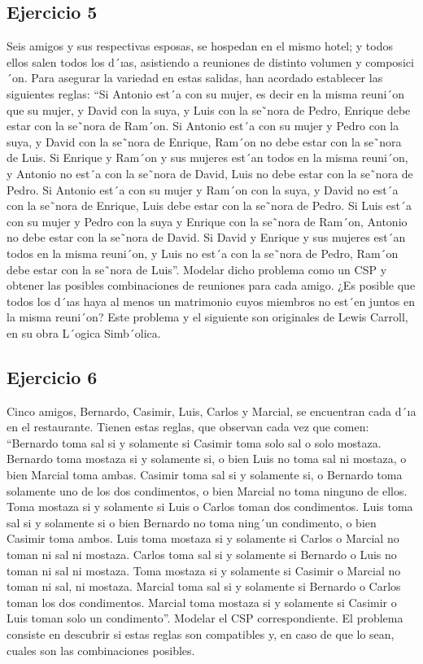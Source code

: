 \subsection{Ejercicio 5} Seis amigos y sus respectivas esposas, se hospedan en el mismo hotel; y todos ellos
salen todos los d´ıas, asistiendo a reuniones de distinto volumen y composici´on. Para
asegurar la variedad en estas salidas, han acordado establecer las siguientes reglas: “Si
Antonio est´a con su mujer, es decir en la misma reuni´on que su mujer, y David con
la suya, y Luis con la se˜nora de Pedro, Enrique debe estar con la se˜nora de Ram´on.
Si Antonio est´a con su mujer y Pedro con la suya, y David con la se˜nora de Enrique,
Ram´on no debe estar con la se˜nora de Luis. Si Enrique y Ram´on y sus mujeres est´an
todos en la misma reuni´on, y Antonio no est´a con la se˜nora de David, Luis no debe
estar con la se˜nora de Pedro. Si Antonio est´a con su mujer y Ram´on con la suya, y
David no est´a con la se˜nora de Enrique, Luis debe estar con la se˜nora de Pedro. Si Luis
est´a con su mujer y Pedro con la suya y Enrique con la se˜nora de Ram´on, Antonio no
debe estar con la se˜nora de David. Si David y Enrique y sus mujeres est´an todos en la
misma reuni´on, y Luis no est´a con la se˜nora de Pedro, Ram´on debe estar con la se˜nora
de Luis”.
\medskip
Modelar dicho problema como un CSP y obtener las posibles combinaciones de reuniones para cada amigo. ¿Es posible que todos los d´ıas haya al menos un matrimonio
cuyos miembros no est´en juntos en la misma reuni´on? Este problema y el siguiente son
originales de Lewis Carroll, en su obra L´ogica Simb´olica.


\subsection{Ejercicio 6} Cinco amigos, Bernardo, Casimir, Luis, Carlos y Marcial, se encuentran cada d´ıa en el
restaurante. Tienen estas reglas, que observan cada vez que comen: “Bernardo toma
sal si y solamente si Casimir toma solo sal o solo mostaza. Bernardo toma mostaza si y
solamente si, o bien Luis no toma sal ni mostaza, o bien Marcial toma ambas. Casimir
toma sal si y solamente si, o Bernardo toma solamente uno de los dos condimentos, o
bien Marcial no toma ninguno de ellos. Toma mostaza si y solamente si Luis o Carlos
toman dos condimentos. Luis toma sal si y solamente si o bien Bernardo no toma
ning´un condimento, o bien Casimir toma ambos. Luis toma mostaza si y solamente
si Carlos o Marcial no toman ni sal ni mostaza. Carlos toma sal si y solamente si
Bernardo o Luis no toman ni sal ni mostaza. Toma mostaza si y solamente si Casimir
o Marcial no toman ni sal, ni mostaza. Marcial toma sal si y solamente si Bernardo o
Carlos toman los dos condimentos. Marcial toma mostaza si y solamente si Casimir o
Luis toman solo un condimento”.
\medskip
Modelar el CSP correspondiente. El problema consiste en descubrir si estas reglas son
compatibles y, en caso de que lo sean, cuales son las combinaciones posibles.

